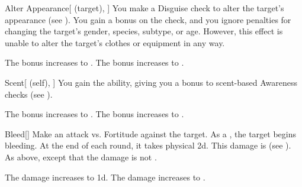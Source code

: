 \lowercase{\hypertarget{spell:Alter Appearance}{}}\label{spell:Alter Appearance}
\begin{attuneability}[Rank 3]{\hypertarget{spell:Alter Appearance}{Alter Appearance}}[ (target), ]
You make a Disguise check to alter the target's appearance (see ).
You gain a  bonus on the check, and you ignore penalties for changing the target's gender, species, subtype, or age.
However, this effect is unable to alter the target's clothes or equipment in any way.

\rankline
{} The bonus increases to .
 The bonus increases to .
\end{attuneability}
\vspace{0.25em}



\lowercase{\hypertarget{spell:Scent}{}}\label{spell:Scent}
\begin{attuneability}[Rank 3]{\hypertarget{spell:Scent}{Scent}}[ (self), ]
You gain the  ability, giving you a  bonus to scent-based Awareness checks (see ).

\rankline
{} The bonus increases to .
 The bonus increases to .
\end{attuneability}
\vspace{0.25em}



\lowercase{\hypertarget{spell:Bleed}{}}\label{spell:Bleed}
\begin{freeability}[Rank 4]{\hypertarget{spell:Bleed}{Bleed}}[]
Make an attack vs. Fortitude against the target.
\hit As a , the target begins bleeding.
At the end of each round, it takes physical  \minus2d.
This damage is  (see ).
\crit As above, except that the damage is not .

\rankline
{} The damage increases to  \minus1d.
 The damage increases to .
\end{freeability}
\vspace{0.25em}



